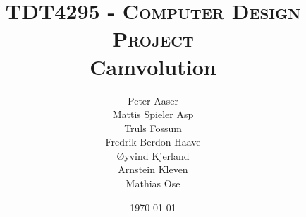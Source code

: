 
\title{
    \textsc{\Large TDT4295 - Computer Design Project}\\[0.5cm]
    {\huge \bfseries Camvolution}
}

\posttitle{
    ~\\[0.4cm]
    \HRule \\[0.4cm]
}

\author{
    Peter Aaser\\
    Mattis Spieler Asp\\
    Truls Fossum\\
    Fredrik Berdon Haave\\
    Øyvind Kjerland\\
    Arnstein Kleven\\
    Mathias Ose
}


\date{\today}

\postdate{
    \par
    \end{center}
}

\maketitle

